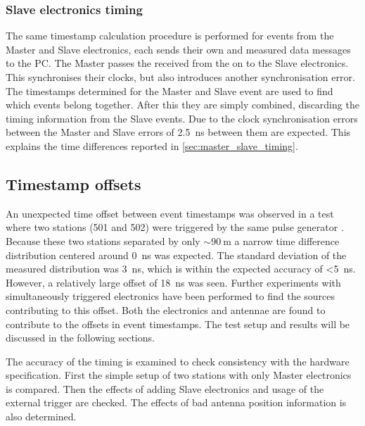 \subsubsection{Slave electronics timing}

The same timestamp calculation procedure is performed for events from the Master and Slave electronics, each sends their own \osm and measured data messages to the PC. The Master passes the received \pps from the \gps on to the Slave electronics. This synchronises their clocks, but also introduces another synchronisation error. The timestamps determined for the Master and Slave event are used to find which events belong together. After this they are simply combined, discarding the timing information from the Slave events. Due to the clock synchronisation errors between the Master and Slave errors of \SI{2.5}{\ns} between them are expected. This explains the time differences reported in \cref{sec:master_slave_timing}.


\subsection{Timestamp offsets}
\label{sec:gps_accuracy}

An unexpected time offset between event timestamps was observed in a test where two \hisparc stations (501 and 502) were triggered by the same pulse generator \cite[p. 47]{fokkema2012hisparc}. Because these two stations separated by only $\sim\SI{90}{\meter}$ a narrow time difference distribution centered around \SI{0}{\ns} was expected. The standard deviation of the measured distribution was \SI{3}{\ns}, which is within the expected \gps accuracy of \SI{<5}{\ns}. However, a relatively large offset of \SI{18}{\ns} was seen. Further experiments with simultaneously triggered \hisparc electronics have been performed to find the sources contributing to this offset. Both the \hisparc electronics and \gps antennae are found to contribute to the offsets in event timestamps. The test setup and results will be discussed in the following sections.

The accuracy of the timing is examined to check consistency with the hardware specification. First the simple setup of two stations with only Master electronics is compared. Then the effects of adding Slave electronics and usage of the external trigger are checked. The effects of bad antenna position information is also determined.


